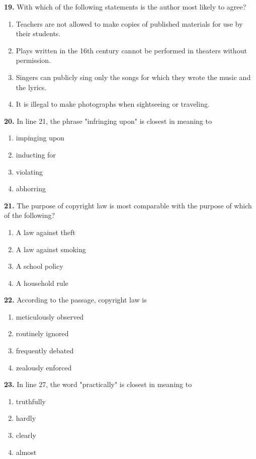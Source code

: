 \documentclass[12pt]{article}
\begin{document}
\par
\vspace{0.25\baselineskip}
\noindent\textbf{19.} With which of the following statements is the author most likely to agree?
\begin{enumerate}[label=(\Alph*),leftmargin=*,itemsep=0.2em]
\item Teachers are not allowed to make copies of published materials for use by their students.
\item Plays written in the 16th century cannot be performed in theaters without permission.
\item Singers can publicly sing only the songs for which they wrote the music and the lyrics.
\item It is illegal to make photographs when sightseeing or traveling.
\end{enumerate}
\par
\vspace{0.25\baselineskip}
\noindent\textbf{20.} In line 21, the phrase "infringing upon" is closest in meaning to
\begin{enumerate}[label=(\Alph*),leftmargin=*,itemsep=0.2em]
\item impinging upon
\item inducting for
\item violating
\item abhorring
\end{enumerate}
\par
\vspace{0.25\baselineskip}
\noindent\textbf{21.} The purpose of copyright law is most comparable with the purpose of which of the following?
\begin{enumerate}[label=(\Alph*),leftmargin=*,itemsep=0.2em]
\item A law against theft
\item A law against smoking
\item A school policy
\item A household rule
\end{enumerate}
\par
\vspace{0.25\baselineskip}
\noindent\textbf{22.} According to the passage, copyright law is
\begin{enumerate}[label=(\Alph*),leftmargin=*,itemsep=0.2em]
\item meticulously observed
\item routinely ignored
\item frequently debated
\item zealously enforced
\end{enumerate}
\par
\vspace{0.25\baselineskip}
\noindent\textbf{23.} In line 27, the word "practically" is closest in meaning to
\begin{enumerate}[label=(\Alph*),leftmargin=*,itemsep=0.2em]
\item truthfully
\item hardly
\item clearly
\item almost
\end{enumerate}
\par
\vspace{0.25\baselineskip}
\end{document}
